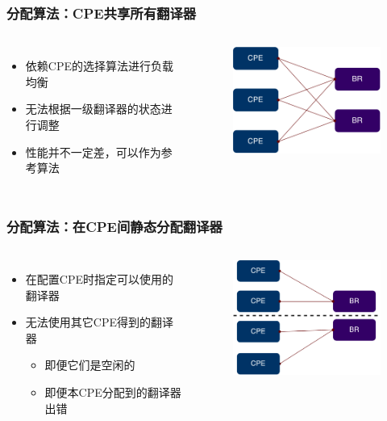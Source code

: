 \documentclass{beamer}
\begin{document}
\begin{frame}
  \frametitle{分配算法：CPE共享所有翻译器}
  \begin{columns}
    \begin{itemize}
    \item 依赖CPE的选择算法进行负载均衡
    \item 无法根据一级翻译器的状态进行调整
    \item 性能并不一定差，可以作为参考算法
    \end{itemize}
    \begin{figure}[ht]
      \begin{center}
        \includegraphics[width=15em]{figs/BR-delegation-shared.pdf}  
      \end{center}
    \end{figure}
  \end{columns}
\end{frame}

\begin{frame}
  \frametitle{分配算法：在CPE间静态分配翻译器}
  \begin{columns}
    \begin{itemize}
    \item 在配置CPE时指定可以使用的翻译器
    \item 无法使用其它CPE得到的翻译器
      \begin{itemize}
      \item 即便它们是空闲的
      \item 即便本CPE分配到的翻译器出错
      \end{itemize}
    \end{itemize}
    \begin{figure}[ht]
      \begin{center}
        \includegraphics[width=15em]{figs/BR-delegation-static.pdf}  
      \end{center}
    \end{figure}
  \end{columns}
\end{frame}
\end{document}
